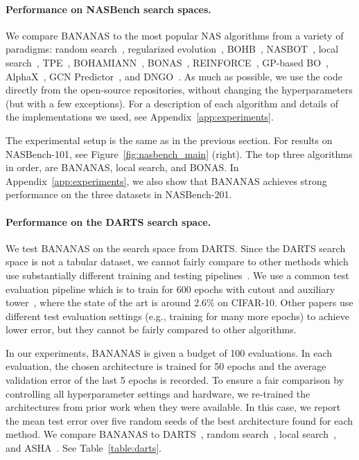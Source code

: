 \documentclass[11pt]{article}
\numberwithin{equation}{section}
\numberwithin{figure}{section}
\theoremstyle{plain}
\theoremstyle{definition}
\begin{document}
\paragraph{Performance on NASBench search spaces.}
We compare BANANAS to the most popular NAS algorithms from a variety of paradigms:
random search~\cite{randomnas},
regularized evolution~\cite{real2019regularized}, 
BOHB~\cite{bohb},
NASBOT~\cite{nasbot},
local search~\cite{white2020local},
TPE~\cite{tpe},
BOHAMIANN~\cite{springenberg2016bayesian},
BONAS~\cite{shi2019multi},
REINFORCE~\cite{reinforce}, 
GP-based BO~\cite{snoek2012practical}, 
AlphaX~\cite{alphax}, 
GCN Predictor~\cite{wen2019neural}, and
DNGO~\cite{snoek2015scalable}.
As much as possible, we use the code directly from the open-source repositories,
without changing the hyperparameters (but with a few exceptions).
For a description of each algorithm and 
details of the implementations we used, see 
Appendix~\ref{app:experiments}.

The experimental setup is the same as in the previous section.
For results on NASBench-101, see Figure~\ref{fig:nasbench_main} (right).
The top three algorithms in order, are BANANAS, local search, and BONAS.
In Appendix~\ref{app:experiments},
we also show that BANANAS achieves strong performance on the three
datasets in NASBench-201.


\paragraph{Performance on the DARTS search space.}
We test BANANAS on the search space from DARTS.
Since the DARTS search space is not a tabular dataset, we cannot fairly compare
to other methods which use substantially different training and testing 
pipelines~\cite{lindauer2019best}.
We use a common test evaluation pipeline which is to train for 
600 epochs with cutout and auxiliary tower~\cite{darts, randomnas, yan2020does},
where the state of the art is around 2.6\% on CIFAR-10. 
Other papers use different test evaluation settings 
(e.g., training for many more epochs) 
to achieve lower error, but they cannot be fairly
compared to other algorithms.


In our experiments,
BANANAS is given a budget of 100 evaluations. In each evaluation, 
the chosen architecture is trained for 50 epochs and the average
validation error of the last 5 epochs is recorded.
To ensure a fair comparison by controlling all hyperparameter settings
and hardware, we re-trained the architectures from prior work
when they were available.
In this case, we report the mean test error over five random seeds of the best architecture
found for each method.
We compare BANANAS to DARTS~\cite{darts}, random search~\cite{darts}, 
local search~\cite{white2020local}, and ASHA~\cite{randomnas}.
See Table~\ref{table:darts}.
\end{document}
